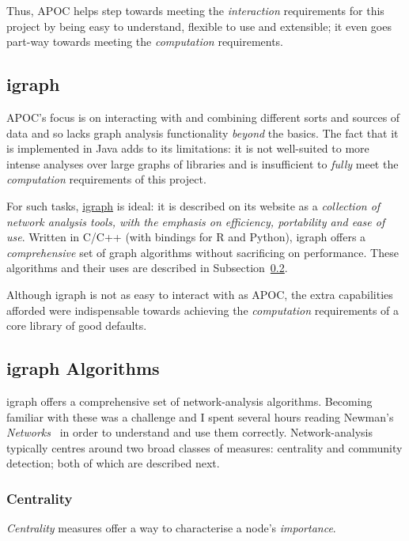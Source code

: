 Thus, APOC helps step towards meeting the \emph{interaction} requirements for
this project by being easy to understand, flexible to use and extensible; it
even goes part-way towards meeting the \emph{computation} requirements.

\subsection{igraph}\label{subsubsec:neo4jtoolsigraph}

APOC's focus is on interacting with and combining different sorts and sources of
data and so lacks graph analysis functionality \emph{beyond} the basics. The
fact that it is implemented in Java adds to its limitations: it is not
well-suited to more intense analyses over large graphs of libraries and is
insufficient to \emph{fully} meet the \emph{computation} requirements of this
project.

For such tasks, \href{http://www.igraph.org}{igraph} is ideal: it is described
on its website as a \emph{collection of network analysis tools, with the
emphasis on efficiency, portability and ease of use}. Written in C/C++ (with
bindings for R and Python), igraph offers a \emph{comprehensive} set of graph
algorithms without sacrificing on performance. These algorithms and their uses
are described in Subsection~\ref{subsec:igraphalg}.

Although igraph is not as easy to interact with  as APOC, the extra capabilities
afforded were indispensable towards achieving the \emph{computation}
requirements of a core library of good defaults.

\subsection{igraph Algorithms}\label{subsec:igraphalg}

igraph offers a comprehensive set of network-analysis algorithms. Becoming
familiar with these was a challenge and I spent several hours reading Newman's
\emph{Networks}~\cite{newman2008} in order to understand and use them correctly.
Network-analysis typically centres around two broad classes of measures:
centrality and community detection; both of which are described next.

\subsubsection{Centrality}

\emph{Centrality} measures offer a way to characterise a node's \emph{importance}.

